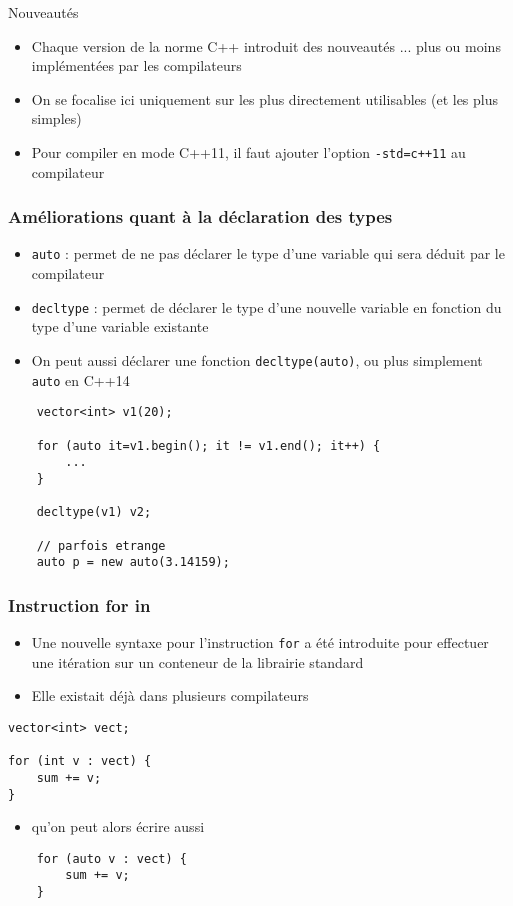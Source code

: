 
\begin{frame}{Nouveautés}
    \begin{itemize}
        \item Chaque version de la norme C++ introduit des nouveautés ... plus ou moins implémentées par les compilateurs 
        \item On se focalise ici uniquement sur les plus directement utilisables (et les plus simples)
        \item Pour compiler en mode C++11, il faut ajouter l'option \texttt{-std=c++11} au compilateur
    \end{itemize}
\end{frame}

\begin{frame}[fragile]
\frametitle{Améliorations quant à la déclaration des types}
    \begin{itemize}
        \item \texttt{auto} : permet de ne pas déclarer le type d'une variable qui sera déduit par le compilateur 
        \item \texttt{decltype} : permet de déclarer le type d'une nouvelle variable en fonction du type d'une variable existante
        \item On peut aussi déclarer une fonction \texttt{decltype(auto)}, ou plus simplement \texttt{auto} en C++14
    \end{itemize}
\begin{lstlisting}
    vector<int> v1(20);

    for (auto it=v1.begin(); it != v1.end(); it++) {
        ...
    }

    decltype(v1) v2;

    // parfois etrange
    auto p = new auto(3.14159);
\end{lstlisting}
\end{frame}

\begin{frame}[fragile]
\frametitle{Instruction for in}
    \begin{itemize}
        \item Une nouvelle syntaxe pour l'instruction \texttt{for} a été introduite pour effectuer une itération sur un conteneur de la librairie standard 
        \item Elle existait déjà dans plusieurs compilateurs
    \end{itemize}
\begin{lstlisting}
vector<int> vect;

for (int v : vect) {
    sum += v;
}
\end{lstlisting}
\begin{itemize}
    \item qu'on peut alors écrire aussi 
\end{itemize}
\begin{lstlisting}
    for (auto v : vect) {
        sum += v;
    }
\end{lstlisting}
\end{frame}

